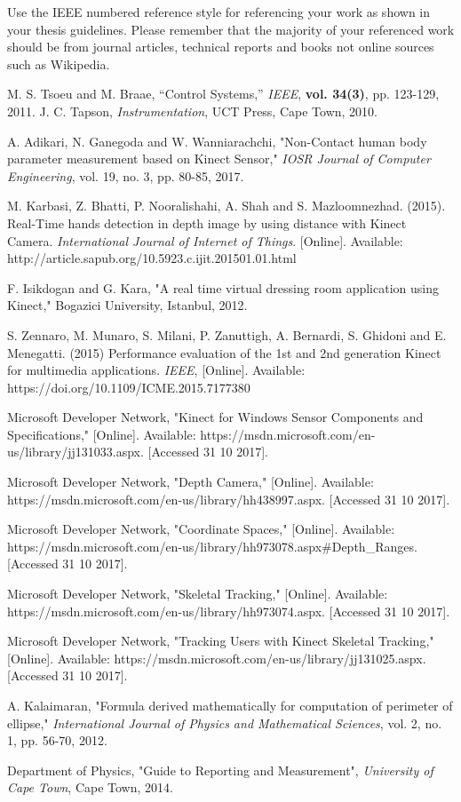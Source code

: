Use the IEEE numbered reference style for referencing your work as shown in your thesis guidelines.
Please remember that the majority of your referenced work should be from journal articles, technical
reports and books not online sources such as Wikipedia.

\begin{thebibliography}{5}
 M. S. Tsoeu and M. Braae, ``Control Systems,'' \emph{IEEE}, {\bf vol. 34(3)}, pp. 123-129, 2011.
 J. C. Tapson, \emph{Instrumentation}, UCT Press, Cape Town, 2010.

 A. Adikari, N. Ganegoda and W. Wanniarachchi, "Non-Contact human body parameter measurement based on Kinect Sensor," \emph{IOSR Journal of Computer Engineering}, vol. 19, no. 3, pp. 80-85, 2017. 

 M. Karbasi, Z. Bhatti, P. Nooralishahi, A. Shah and S. Mazloomnezhad. (2015). Real-Time hands detection in depth image by using distance with Kinect Camera. \emph{International Journal of Internet of Things}. [Online]. Available: http://article.sapub.org/10.5923.c.ijit.201501.01.html

 F. Isikdogan and G. Kara, "A real time virtual dressing room application using Kinect," Bogazici University, Istanbul, 2012.

 S. Zennaro, M. Munaro, S. Milani, P. Zanuttigh, A. Bernardi, S. Ghidoni and E. Menegatti. (2015) Performance evaluation of the 1st and 2nd generation Kinect for multimedia applications. \emph{IEEE}, [Online]. Available: https://doi.org/10.1109/ICME.2015.7177380

 Microsoft Developer Network, "Kinect for Windows Sensor Components and Specifications," [Online]. Available: https://msdn.microsoft.com/en-us/library/jj131033.aspx. [Accessed 31 10 2017].

 Microsoft Developer Network, "Depth Camera," [Online]. Available: https://msdn.microsoft.com/en-us/library/hh438997.aspx. [Accessed 31 10 2017].

 Microsoft Developer Network, "Coordinate Spaces," [Online]. Available: https://msdn.microsoft.com/en-us/library/hh973078.aspx\#Depth\_Ranges. [Accessed 31 10 2017].

 Microsoft Developer Network, "Skeletal Tracking," [Online]. Available: https://msdn.microsoft.com/en-us/library/hh973074.aspx. [Accessed 31 10 2017].

 Microsoft Developer Network, "Tracking Users with Kinect Skeletal Tracking," [Online]. Available: https://msdn.microsoft.com/en-us/library/jj131025.aspx. [Accessed 31 10 2017].

 A. Kalaimaran, "Formula derived mathematically for computation of perimeter of ellipse," \emph{International Journal of Physics and Mathematical Sciences}, vol. 2, no. 1, pp. 56-70, 2012.

 Department of Physics, "Guide to Reporting and Measurement", \emph{University of Cape Town}, Cape Town, 2014.
\end{thebibliography}
